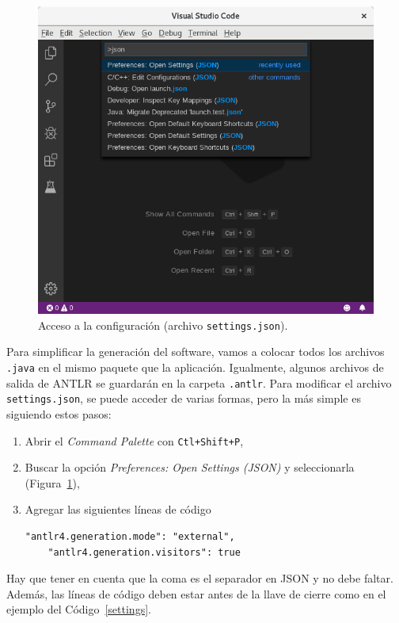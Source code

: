 \documentclass[a5paper,10pt]{article}
\begin{document}
\begin{figure}[p]
	\centering
	\includegraphics[width=.95\textwidth]{img/SelectJSON}
	\caption{Acceso a la configuración (archivo \texttt{settings.json}).}
	\label{preferences}
\end{figure}

Para simplificar la generación del software, vamos a colocar todos los archivos \verb|.java| en el mismo paquete que la aplicación.  Igualmente, algunos archivos de salida de ANTLR se guardarán en la carpeta \verb|.antlr|.  Para modificar el archivo \verb|settings.json|, se puede acceder de varias formas, pero la más simple es siguiendo estos pasos:
\begin{enumerate}
	\item Abrir el \emph{Command Palette} con \verb|Ctl+Shift+P|,
	\item Buscar la opción \emph{Preferences: Open Settings (JSON)} y seleccionarla (Figura~\ref{preferences}),
	\item Agregar las siguientes líneas de código
	\begin{lstlisting}[style=miJSON]
	"antlr4.generation.mode": "external",
	"antlr4.generation.visitors": true
	\end{lstlisting}
\end{enumerate}
Hay que tener en cuenta que la coma es el separador en JSON y no debe faltar.  Además, las líneas de código deben estar antes de la llave de cierre como en el ejemplo del Código~\ref{settings}.
\end{document}
